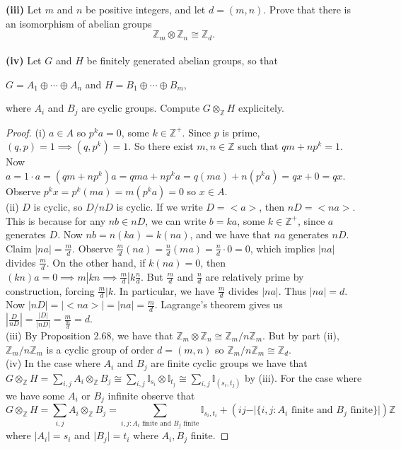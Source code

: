 \documentclass[8pt]{amsart}
\theoremstyle{plain}%
\theoremstyle{definition}
\theoremstyle{remark}
\numberwithin{equation}{section}
\newcommand{\Z}{\mathbb{Z}}
\newcommand{\I}{\mathbb{I}}
\newcommand{\D}{\displaystyle}
\begin{document}
\indent \textbf{(iii)} Let $m$ and $n$ be positive integers, and let $d =(m,n)$. Prove that there is an isomorphism of abelian groups $$\Z_m \otimes \Z_n \cong \Z_d.$$ \\
\indent \textbf{(iv)} Let $G$ and $H$ be finitely generated abelian groups, so that \\

	\begin{center}
$G=A_1 \oplus \cdots \oplus A_n$ and $H=B_1 \oplus \cdots \oplus B_m,$  \\
	\end{center} 
	
where $A_i$ and $B_j$ are cyclic groups. Compute $G \otimes_{\Z}H$ explicitely. 
\begin{proof}
(i) $a \in A$ so $p^ka=0$, some $k \in \Z^+$. Since $p$ is prime, $(q,p)=1 \implies (q,p^k)=1$. So there exist $m,n \in \Z$ such that $qm+np^k=1$. Now $a=1\cdot a=(qm+np^k)a=qma+np^ka=q(ma)+n(p^ka)=qx+0=qx$. Observe $p^kx=p^k(ma)=m(p^ka)=0$ so $x\in A$.\\

(ii) $D$ is cyclic, so $D/nD$ is cyclic. If we write $D=<a>$, then $nD =<na>$. This is because for any $nb \in nD$, we can write $b=ka$, some $k\in \Z^+$, since $a$ generates $D$. Now $nb=n(ka)=k(na)$, and we have that $na$ generates $nD$. \\

Claim $|na|=\frac{m}{d}$. Observe $\frac{m}{d}(na)=\frac{n}{d}(ma)=\frac{n}{d}\cdot 0=0$, which implies $|na|$ divides $\frac{m}{d}$. On the other hand, if $k(na)=0$, then $(kn)a=0 \implies m|kn \implies \frac{m}{d}|k\frac{n}{d}$. But $\frac{m}{d}$ and $\frac{n}{d}$ are relatively prime by construction, forcing $\frac{m}{d}|k$. In particular, we have $\frac{m}{d}$ divides $|na|$. Thus $|na|=d$. Now $|nD|=|<na>|=|na|=\frac{m}{d}$. Lagrange's theorem gives us $|\frac{D}{nD}|=\frac{|D|}{|nD|}=\frac{m}{\frac{m}{d}}=d$. \\

(iii) By Proposition 2.68, we have that $\Z_m \otimes \Z_n \cong \Z_m/n\Z_m$. But by part (ii), $\Z_m/n\Z_m$ is a cyclic group of order $d=(m,n)$ so $\Z_m/n\Z_m \cong \Z_d$.\\

(iv) In the case where $A_i$ and $B_j$ are finite cyclic groups we have that $G \otimes_\Z H = \D \sum_{i, j} A_i \otimes_\Z B_j \cong \sum_{i, j} \I_{s_i} \otimes \I_{t_j} \cong \sum_{i, j} \I_{(s_i, t_j)}$ by (iii). For the case where we have some $A_i$ or $B_j$ infinite observe that $$G \otimes_\Z H = \D \sum_{i, j} A_i \otimes_\Z B_j = \sum_{i, j : A_i \text{ finite and } B_j \text{ finite}} \I_{s_i, t_i} + (ij -\vert \{i, j : A_i \text{ finite and } B_j \text{ finite}\}\vert) \Z$$ where $\vert A_i \vert = s_i$ and $\vert B_j \vert = t_i$ where $A_i, B_j$ finite.

\end{proof}
\end{document}
